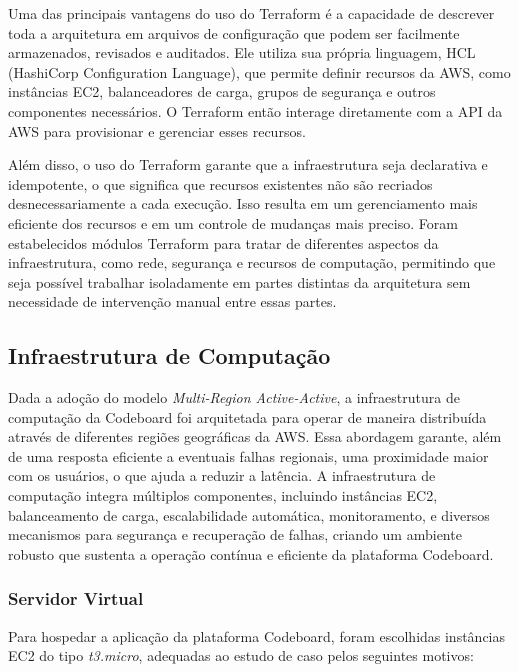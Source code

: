 Uma das principais vantagens do uso do Terraform é a capacidade de descrever toda a arquitetura em arquivos de configuração que podem ser facilmente armazenados, revisados e auditados. Ele utiliza sua própria linguagem, HCL (HashiCorp Configuration Language), que permite definir recursos da AWS, como instâncias EC2, balanceadores de carga, grupos de segurança e outros componentes necessários. O Terraform então interage diretamente com a API da AWS para provisionar e gerenciar esses recursos.

Além disso, o uso do Terraform garante que a infraestrutura seja declarativa e idempotente, o que significa que recursos existentes não são recriados desnecessariamente a cada execução. Isso resulta em um gerenciamento mais eficiente dos recursos e em um controle de mudanças mais preciso. Foram estabelecidos módulos Terraform para tratar de diferentes aspectos da infraestrutura, como rede, segurança e recursos de computação, permitindo que seja possível trabalhar isoladamente em partes distintas da arquitetura sem necessidade de intervenção manual entre essas partes.


\subsection{Infraestrutura de Computação}

Dada a adoção do modelo \emph{Multi-Region Active-Active}, a infraestrutura de computação da Codeboard foi arquitetada para operar de maneira distribuída através de diferentes regiões geográficas da AWS. Essa abordagem garante, além de uma resposta eficiente a eventuais falhas regionais, uma proximidade maior com os usuários, o que ajuda a reduzir a latência. A infraestrutura de computação integra múltiplos componentes, incluindo instâncias EC2, balanceamento de carga, escalabilidade automática, monitoramento, e diversos mecanismos para segurança e recuperação de falhas, criando um ambiente robusto que sustenta a operação contínua e eficiente da plataforma Codeboard.

\subsubsection{Servidor Virtual}

Para hospedar a aplicação da plataforma Codeboard, foram escolhidas instâncias EC2 do tipo \emph{t3.micro}, adequadas ao estudo de caso pelos seguintes motivos: 

